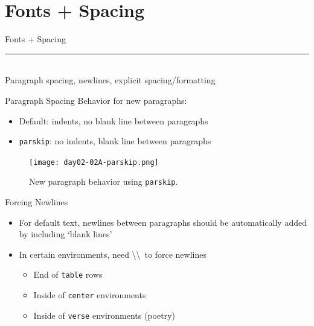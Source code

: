 \documentclass{beamer}
\begin{document}
{\section{Fonts + Spacing}

  \begin{frame}[plain]
    \vfill
    \centering
    \begin{beamercolorbox}[sep=8pt,center,shadow=true,rounded=true]{Fonts + Spacing}
      \insertsectionhead\par%
      \color{davisblue}\noindent\rule{10cm}{1pt} \\
      \footnotesize{Paragraph spacing, newlines, explicit spacing/formatting}
    \end{beamercolorbox}
    \vfill
  \end{frame}

  \begin{frame}{Paragraph Spacing}
    Behavior for new paragraphs:
    \begin{itemize}
      \item Default: indents, no blank line between paragraphs
      \item \texttt{parskip}: no indents, blank line between paragraphs
    \end{itemize}
    \begin{figure}
      \texttt{[image: day02-02A-parskip.png]}
      \caption{New paragraph behavior using \texttt{parskip}.}
      \label{fig:day02-02A}
    \end{figure}
  \end{frame}

  \begin{frame}{Forcing Newlines}
    \begin{itemize}
      \item For default text, newlines between paragraphs should be automatically added by including `blank lines'
      \item In certain environments, need \textbackslash\textbackslash \, to force newlines
      \begin{itemize}
        \item End of \texttt{table} rows
        \item Inside of \texttt{center} environments
        \item Inside of \texttt{verse} environments (poetry)
      \end{itemize}
    \end{itemize}
  \end{frame}

}
\end{document}
